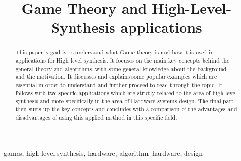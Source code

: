 \documentclass[conference]{IEEEtran}
\begin{document}
\title{Game Theory and High-Level-Synthesis applications\\
}

\author{

}

\maketitle

\begin{abstract}
This paper´s goal is to understand what Game theory is and how it is used in applications for High level synthesis. It focuses on the main key concepts behind the general theory and algorithms, with some general knowledge about the background and the motivation. It discusses and explains some popular examples which are essential in order to understand and further proceed to read through the topic. It follows with two specific applications which are strictly related to the area of high level synthesis and more specifically in the area of Hardware systems design. The final part then sums up the key concepts and concludes with a comparison of the advantages and disadvantages of using this applied method in this specific field. 
\end{abstract}

\begin{IEEEkeywords}
games, high-level-synthesis, hardware, algorithm, hardware, design
\end{IEEEkeywords}
\end{document}
